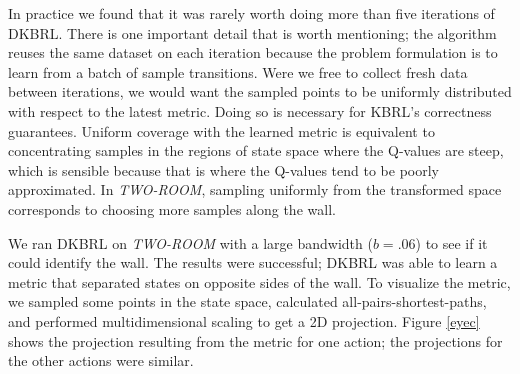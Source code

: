 \documentclass{article} %
\begin{document}
In practice we found that it was rarely worth doing more than five
iterations of DKBRL.
There is one important detail that is worth mentioning;
the algorithm reuses the same dataset on each iteration because
the problem formulation is to learn from a batch of sample transitions.
Were we free to collect fresh data between iterations, we would want the sampled
points to be uniformly distributed with respect to the latest metric.
Doing so is necessary for KBRL's correctness guarantees.
Uniform coverage with the learned metric is equivalent to concentrating samples in the
regions of state space where the Q-values are steep, which is sensible
because that is where the Q-values tend to be poorly approximated.
In \textit{TWO-ROOM}, sampling uniformly from the transformed space corresponds
to choosing more samples along the wall.

We ran DKBRL on \textit{TWO-ROOM} with a large bandwidth ($b = .06$) to see if it
could identify the wall.
The results were successful; DKBRL was able to learn a metric that separated
states on opposite sides of the wall.
To visualize the metric, we sampled some points in the state space, calculated
all-pairs-shortest-paths, and performed multidimensional scaling \cite{mds} to get a 2D projection.
Figure \ref{eyec} shows the projection resulting from the metric for 
one action; the projections for the other actions were similar.
\end{document}
